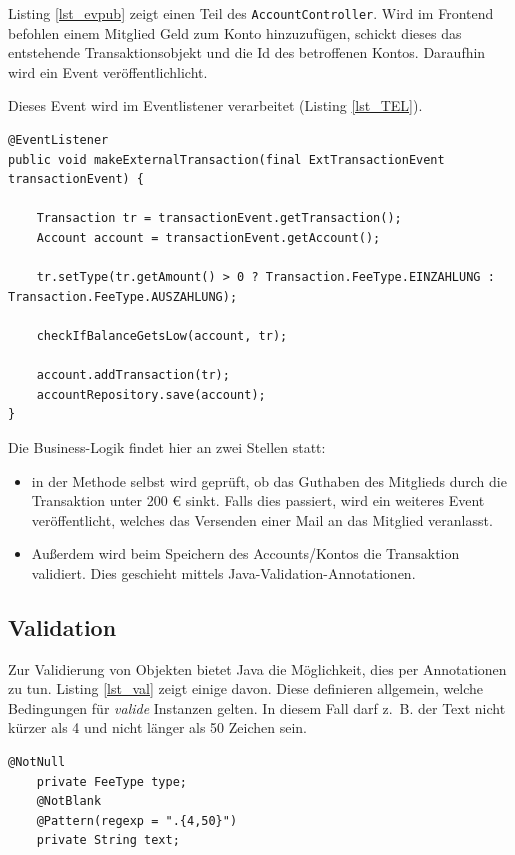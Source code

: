 \documentclass[a4paper, 11pt]{article}
\providecommand{\tightlist}{%
  \setlength{\itemsep}{0pt}\setlength{\parskip}{0pt}}
\begin{document}
Listing \ref{lst_evpub} zeigt einen Teil des \lstinline{AccountController}. Wird im
Frontend befohlen einem Mitglied Geld zum Konto hinzuzufügen, schickt dieses
das entstehende Transaktionsobjekt und die Id des betroffenen Kontos. Daraufhin
wird ein Event veröffentlichlicht.

Dieses Event wird im Eventlistener verarbeitet (Listing \ref{lst_TEL}).

\begin{lstlisting}[caption=Eventlistener für externe Transaktionen,label=lst_TEL]
@EventListener
public void makeExternalTransaction(final ExtTransactionEvent transactionEvent) {

    Transaction tr = transactionEvent.getTransaction();
    Account account = transactionEvent.getAccount();

    tr.setType(tr.getAmount() > 0 ? Transaction.FeeType.EINZAHLUNG : Transaction.FeeType.AUSZAHLUNG);

    checkIfBalanceGetsLow(account, tr);

    account.addTransaction(tr);
    accountRepository.save(account);
}
\end{lstlisting}

Die Business-Logik findet hier an zwei Stellen statt:

\begin{itemize}
    \tightlist
    \item in der Methode selbst wird geprüft, ob das Guthaben des Mitglieds
        durch die Transaktion unter 200 \euro{} sinkt. Falls dies passiert, wird ein
        weiteres Event veröffentlicht, welches das Versenden einer Mail an das
        Mitglied veranlasst.
    \item Außerdem wird beim Speichern des Accounts/Kontos die Transaktion
        validiert. Dies geschieht mittels Java-Validation-Annotationen.
\end{itemize}

\subsection{Validation}

Zur Validierung von Objekten bietet Java die Möglichkeit, dies per Annotationen
zu tun. Listing \ref{lst_val} zeigt einige davon. Diese definieren allgemein,
welche Bedingungen für \emph{valide} Instanzen gelten. In diesem Fall darf
z.~B. der Text nicht kürzer als 4 und nicht länger als 50 Zeichen sein. 

\begin{lstlisting}[caption=Validierung von Business-Objekten per Annotation, label=lst_val]
    @NotNull
    private FeeType type;
    @NotBlank
    @Pattern(regexp = ".{4,50}")
    private String text;
\end{lstlisting}
\end{document}
